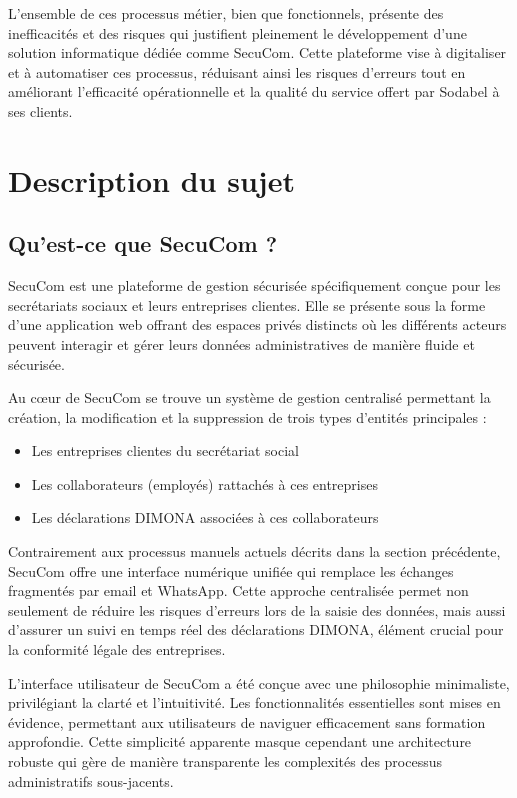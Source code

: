 \documentclass[12pt,a4paper]{report}
\begin{document}
L'ensemble de ces processus métier, bien que fonctionnels, présente des inefficacités et des risques qui justifient pleinement le développement d'une solution informatique dédiée comme SecuCom. Cette plateforme vise à digitaliser et à automatiser ces processus, réduisant ainsi les risques d'erreurs tout en améliorant l'efficacité opérationnelle et la qualité du service offert par Sodabel à ses clients.

\chapter{Description du sujet}

\section{Qu'est-ce que SecuCom ?}

SecuCom est une plateforme de gestion sécurisée spécifiquement conçue pour les secrétariats sociaux et leurs entreprises clientes. Elle se présente sous la forme d'une application web offrant des espaces privés distincts où les différents acteurs peuvent interagir et gérer leurs données administratives de manière fluide et sécurisée.

Au cœur de SecuCom se trouve un système de gestion centralisé permettant la création, la modification et la suppression de trois types d'entités principales :
\begin{itemize}
  \item Les entreprises clientes du secrétariat social
  \item Les collaborateurs (employés) rattachés à ces entreprises
  \item Les déclarations DIMONA associées à ces collaborateurs
\end{itemize}

Contrairement aux processus manuels actuels décrits dans la section précédente, SecuCom offre une interface numérique unifiée qui remplace les échanges fragmentés par email et WhatsApp. Cette approche centralisée permet non seulement de réduire les risques d'erreurs lors de la saisie des données, mais aussi d'assurer un suivi en temps réel des déclarations DIMONA, élément crucial pour la conformité légale des entreprises.

L'interface utilisateur de SecuCom a été conçue avec une philosophie minimaliste, privilégiant la clarté et l'intuitivité. Les fonctionnalités essentielles sont mises en évidence, permettant aux utilisateurs de naviguer efficacement sans formation approfondie. Cette simplicité apparente masque cependant une architecture robuste qui gère de manière transparente les complexités des processus administratifs sous-jacents.
\end{document}

